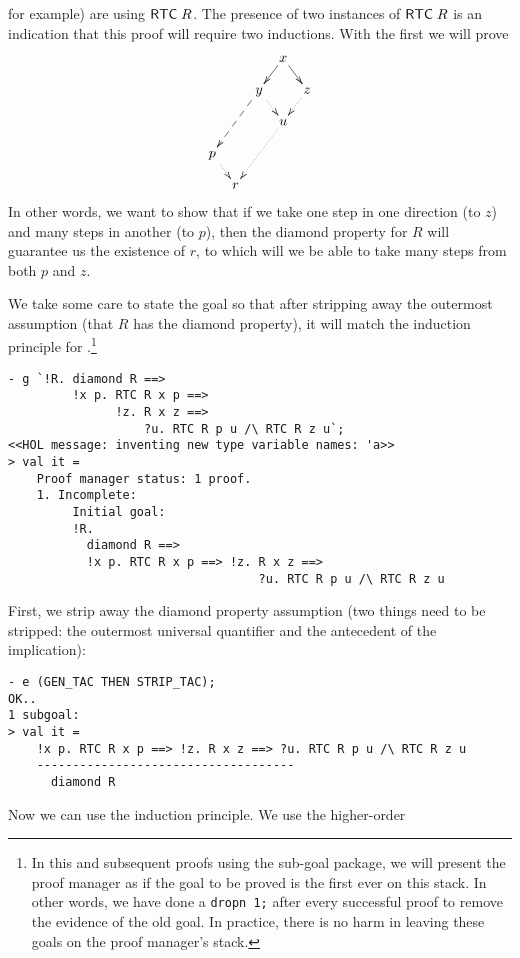 for example) are using ${\sf RTC}\;R$.  The presence of two instances
of ${\sf RTC}\;R$ is an indication that this proof will require two
inductions.  With the first we will prove
\[\xymatrix @R=4mm @C=2mm {
& & & x \ar[dl] \ar[dr] & \\
& & y \ar@{.>}[dr] \ar@{-->}[ddll] & & z \ar@{.>}[dl] \\
& & & u \ar@{.>}[ddll] \\
p \ar@{.>}[dr] \\
& r}\]
In other words, we want to show that if we take one step in one
direction (to $z$) and many steps in another (to $p$), then the
diamond property for $R$ will guarantee us the existence of $r$,
to which will we be able to take many steps from both $p$ and $z$.

We take some care to state the goal so that after stripping away the
outermost assumption (that $R$ has the diamond property), it will match the
induction principle for .\footnote{In this and subsequent
  proofs using the sub-goal package, we will present the proof manager
  as if the goal to be proved is the first ever on this stack.  In
  other words, we have done a \texttt{dropn 1;} after every successful
  proof to remove the evidence of the old goal.  In practice, there is
  no harm in leaving these goals on the proof manager's stack.}
\begin{session}
\begin{verbatim}
- g `!R. diamond R ==>
         !x p. RTC R x p ==>
               !z. R x z ==>
                   ?u. RTC R p u /\ RTC R z u`;
<<HOL message: inventing new type variable names: 'a>>
> val it =
    Proof manager status: 1 proof.
    1. Incomplete:
         Initial goal:
         !R.
           diamond R ==>
           !x p. RTC R x p ==> !z. R x z ==>
                                   ?u. RTC R p u /\ RTC R z u
\end{verbatim}
\end{session}
First, we strip away the diamond property assumption (two things need to
be stripped: the outermost universal quantifier and the antecedent of
the implication):
\begin{session}
\begin{verbatim}
- e (GEN_TAC THEN STRIP_TAC);
OK..
1 subgoal:
> val it =
    !x p. RTC R x p ==> !z. R x z ==> ?u. RTC R p u /\ RTC R z u
    ------------------------------------
      diamond R
\end{verbatim}
\end{session}
Now we can use the induction principle.  We use the higher-order
